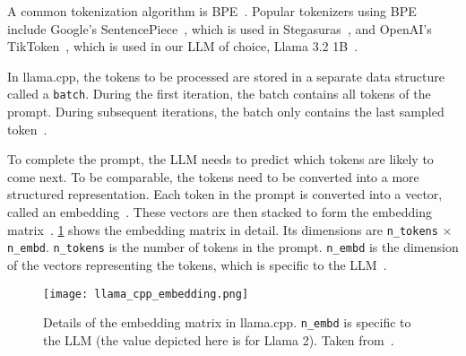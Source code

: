 A common tokenization algorithm is \gls{BPE}~\cite{sennrichNeuralMachineTranslation2016}. Popular tokenizers using \gls{BPE} include Google's SentencePiece~\cite{googleGoogleSentencepiece2024}, which is used in Stegasuras~\cite{zieglerHarvardnlpNeuralSteganography2025,zieglerStegasuras2025}, and OpenAI's TikToken~\cite{openaiOpenaiTiktoken2025}, which is used in our \gls{LLM} of choice, Llama 3.2 1B~\cite{metaMetallamaLlamamodels2025}.

In llama.cpp, the tokens to be processed are stored in a separate data structure called a \lstinline|batch|. During the first iteration, the batch contains all tokens of the prompt. During subsequent iterations, the batch only contains the last sampled token~\cite{gerganovGgerganovLlamacpp2024}.

To complete the prompt, the \gls{LLM} needs to predict which tokens are likely to come next. To be comparable, the tokens need to be converted into a more structured representation. Each token in the prompt is converted into a vector, called an embedding~\cite{mallisUnderstandingHowLLM2023}. These vectors are then stacked to form the embedding matrix~\cite{mallisUnderstandingHowLLM2023}. \cref{fig:llamaCppEmbedding} shows the embedding matrix in detail. Its dimensions are \lstinline|n_tokens| $\times$ \lstinline|n_embd|. \lstinline|n_tokens| is the number of tokens in the prompt. \lstinline|n_embd| is the dimension of the vectors representing the tokens, which is specific to the \gls{LLM}~\cite{mallisUnderstandingHowLLM2023}.

\begin{figure}
    \begin{wide}
        \centering
        \captionsetup{width=\linewidth}
        \texttt{[image: llama\_cpp\_embedding.png]}
        \caption[llama.cpp: Embedding matrix]{Details of the embedding matrix in llama.cpp. \lstinline|n_embd| is specific to the \gls{LLM} (the value depicted here is for Llama 2). Taken from~\cite{mallisUnderstandingHowLLM2023}.}
        \label{fig:llamaCppEmbedding}
    \end{wide}
\end{figure}

